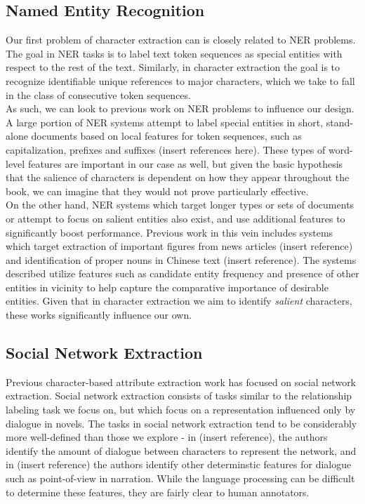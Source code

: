 \documentclass[12pt]{article}
\begin{document}
\subsection{Named Entity Recognition}

    Our first problem of character extraction can is closely related to NER problems. The goal in NER tasks
    is to label text token sequences as special entities with respect to the rest of the text. Similarly, in 
    character extraction the goal is to recognize identifiable unique references to major characters, which
    we take to fall in the class of consecutive token sequences. \\

    As such, we can look to previous work on NER problems to influence our design. A large portion of NER systems
    attempt to label special entities in short, stand-alone documents based on local features for token
    sequences, such as capitalization, prefixes and suffixes (insert references here). These types of word-level
    features are important in our case as well, but given the basic hypothesis that the salience of characters 
    is dependent on how they appear throughout the book, we can imagine that they would not prove particularly 
    effective. \\

    On the other hand, NER systems which target longer types or sets of documents or attempt to focus on
    salient entities also exist, and use additional features to significantly boost performance. 
    Previous work in this vein includes systems which target extraction of important figures 
    from news articles (insert reference) and identification of proper nouns in Chinese text (insert reference).
    The systems described utilize features such as candidate entity frequency and presence of other
    entities in vicinity to help capture the comparative importance of desirable entities. Given that in 
    character extraction we aim to identify \emph{salient} characters, these works significantly influence
    our own. \\

\subsection{Social Network Extraction}

    Previous character-based attribute extraction work has focused on social network extraction.
    Social network extraction consists of tasks similar to the relationship labeling task we focus on, but which 
    focus on a representation influenced only by dialogue in novels. The tasks in social network
    extraction tend to be considerably more well-defined than those we explore - in (insert reference),
    the authors identify the amount of dialogue between characters to represent the network, and in
    (insert reference) the authors identify other determinstic features for dialogue such as
    point-of-view in narration. While the language processing can be difficult to determine these
    features, they are fairly clear to human annotators. \\
\end{document}
